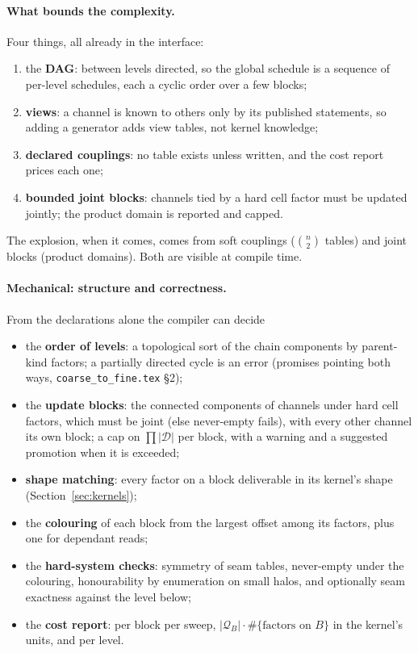 \documentclass[11pt]{article}
\newcommand{\1}{\mathds{1}}
\newcommand{\Dom}{\mathcal{D}}
\newcommand{\Cand}{\mathcal{Q}}
\begin{document}
\paragraph{What bounds the complexity.} Four things, all already in the
interface:
\begin{enumerate}
  \item the \textbf{DAG}: between levels directed, so the global schedule is a
        sequence of per-level schedules, each a cyclic order over a few blocks;
  \item \textbf{views}: a channel is known to others only by its published
        statements, so adding a generator adds view tables, not kernel knowledge;
  \item \textbf{declared couplings}: no table exists unless written, and the cost
        report prices each one;
  \item \textbf{bounded joint blocks}: channels tied by a hard cell factor must be
        updated jointly; the product domain is reported and capped.
\end{enumerate}
The explosion, when it comes, comes from soft couplings ($\binom{n}{2}$ tables)
and joint blocks (product domains). Both are visible at compile time.

\paragraph{Mechanical: structure and correctness.} From the declarations alone
the compiler can decide
\begin{itemize}
  \item the \textbf{order of levels}: a topological sort of the chain components by
        parent-kind factors; a partially directed cycle is an error (promises
        pointing both ways, \texttt{coarse\_to\_fine.tex} \S2);
  \item the \textbf{update blocks}: the connected components of channels under hard
        cell factors, which must be joint (else never-empty fails), with every
        other channel its own block; a cap on $\prod |\Dom|$ per block, with a
        warning and a suggested promotion when it is exceeded;
  \item \textbf{shape matching}: every factor on a block deliverable in its kernel's
        shape (Section~\ref{sec:kernels});
  \item the \textbf{colouring} of each block from the largest offset among its
        factors, plus one for dependant reads;
  \item the \textbf{hard-system checks}: symmetry of seam tables, never-empty under
        the colouring, honourability by enumeration on small halos, and
        optionally seam exactness against the level below;
  \item the \textbf{cost report}: per block per sweep,
        $|\Cand_B| \cdot \#\{\text{factors on } B\}$ in the kernel's units, and
        per level.
\end{itemize}
\end{document}
